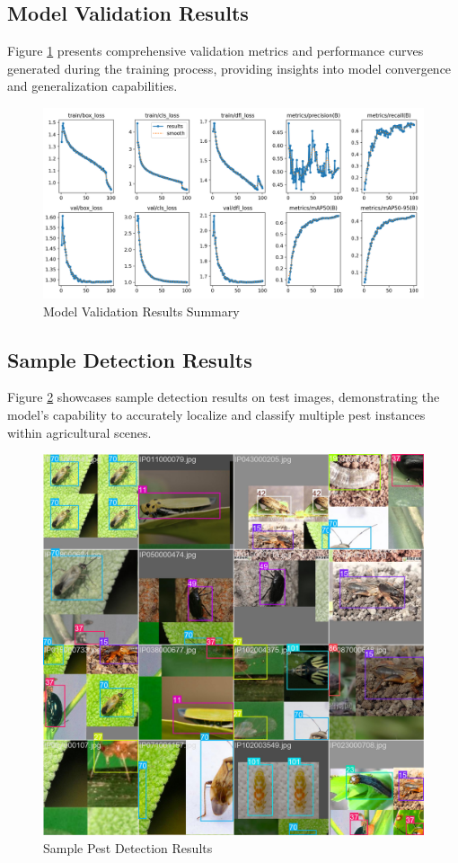 \documentclass[conference]{IEEEtran}
\begin{document}
\subsection{Model Validation Results}

Figure \ref{fig:results} presents comprehensive validation metrics and performance curves generated during the training process, providing insights into model convergence and generalization capabilities.

\begin{figure}[htbp]
\centerline{\includegraphics[width=0.8\columnwidth]{results.png}}
\caption{Model Validation Results Summary}
\label{fig:results}
\end{figure}

\subsection{Sample Detection Results}

Figure \ref{fig:detection_results} showcases sample detection results on test images, demonstrating the model's capability to accurately localize and classify multiple pest instances within agricultural scenes.

\begin{figure}[htbp]
\centerline{\includegraphics[width=\columnwidth]{detection_results.png}}
\caption{Sample Pest Detection Results}
\label{fig:detection_results}
\end{figure}
\end{document}
